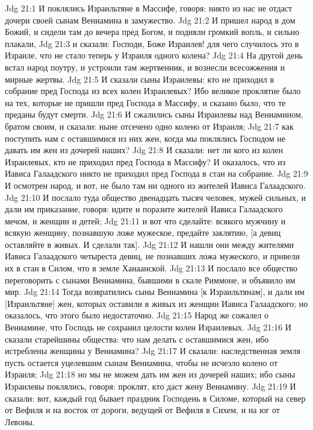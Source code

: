 \vs Jdg 21:1 И поклялись Израильтяне в Массифе, говоря: никто из нас не отдаст дочери своей сынам Вениамина в замужество.
\vs Jdg 21:2 И пришел народ в дом Божий, и сидели там до вечера пред Богом, и подняли громкий вопль, и сильно плакали,
\vs Jdg 21:3 и сказали: Господи, Боже Израилев! для чего случилось это в Израиле, что не стало теперь у Израиля одного колена?
\vs Jdg 21:4 На другой день встал народ поутру, и устроили там жертвенник, и вознесли всесожжения и мирные жертвы.
\vs Jdg 21:5 И сказали сыны Израилевы: кто не приходил в собрание пред Господа из всех колен Израилевых? Ибо великое проклятие  было на тех, которые не пришли пред Господа в Массифу, и сказано было, что те преданы будут смерти.
\vs Jdg 21:6 И сжалились сыны Израилевы над Вениамином, братом своим, и сказали: ныне отсечено одно колено от Израиля;
\vs Jdg 21:7 как поступить нам с оставшимися из них  жен, когда мы поклялись Господом не давать им жен из дочерей наших?
\vs Jdg 21:8 И сказали: нет ли кого из колен Израилевых, кто не приходил пред Господа в Массифу? И оказалось, что из Иависа Галаадского никто не приходил пред Господа в стан на собрание.
\vs Jdg 21:9 И осмотрен народ, и вот, не было там ни одного из жителей Иависа Галаадского.
\vs Jdg 21:10 И послало туда общество двенадцать тысяч человек, мужей сильных, и дали им приказание, говоря: идите и поразите жителей Иависа Галаадского мечом, и женщин и детей;
\vs Jdg 21:11 и вот что сделайте: всякого мужчину и всякую женщину, познавшую ложе мужеское, предайте заклятию, [а девиц оставляйте в живых. И сделали так].
\vs Jdg 21:12 И нашли они между жителями Иависа Галаадского четыреста девиц, не познавших ложа мужеского, и привели их в стан в Силом, что в земле Ханаанской.
\vs Jdg 21:13 И послало все общество переговорить с сынами Вениамина, бывшими в скале Риммоне, и объявило им мир.
\vs Jdg 21:14 Тогда возвратились сыны Вениамина [к Израильтянам], и дали им [Израильтяне] жен, которых оставили в живых из женщин Иависа Галаадского; но оказалось, что этого было недостаточно.
\vs Jdg 21:15 Народ же сожалел о Вениамине, что Господь не сохранил целости колен Израилевых.
\vs Jdg 21:16 И сказали старейшины общества: что нам делать с оставшимися  жен, ибо истреблены женщины у Вениамина?
\vs Jdg 21:17 И сказали: наследственная земля пусть остается уцелевшим сынам Вениамина, чтобы не исчезло колено от Израиля;
\vs Jdg 21:18 но мы не можем дать им жен из дочерей наших; ибо сыны Израилевы поклялись, говоря: проклят, кто даст жену Вениамину.
\vs Jdg 21:19 И сказали: вот, каждый год бывает праздник Господень в Силоме, который на север от Вефиля и на восток от дороги, ведущей от Вефиля в Сихем, и на юг от Левоны.
